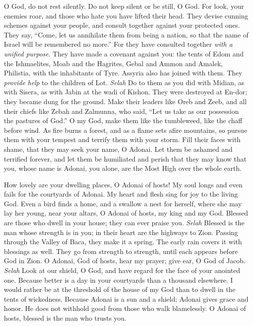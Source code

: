 \begin{biblechapter} %
 O God, do not rest silently. 
Do not keep silent or be still, O God.
\verse For look, your enemies roar, 
and those who hate you have lifted their head.
\verse They devise cunning schemes against your people, 
and consult together against your protected ones.
\verse They say, “Come, let us annihilate them from being a nation, 
so that the name of Israel will be remembered no more.”
\verse For they have consulted together \textit{with a unified purpose}. 
They have made a covenant against you:
\verse the tents of Edom and the Ishmaelites, 
Moab and the Hagrites,
\verse Gebal and Ammon and Amalek, 
Philistia, with the inhabitants of Tyre.
\verse Assyria also has joined with them. 
They \textit{provide help} to the children of Lot. \textit{Selah}
\verse Do to them as you did with Midian, 
as with Sisera, as with Jabin at the wadi of Kishon.
\verse They were destroyed at En-dor; 
they became dung for the ground.
\verse Make their leaders like Oreb and Zeeb, 
and all their chiefs like Zebah and Zalmunna,
\verse who said, “Let us take as our possession 
the pastures of God.”
\verse O my God, make them like the tumbleweed, 
like the chaff before wind.
\verse As fire burns a forest, 
and as a flame sets afire mountains,
\verse so pursue them with your tempest 
and terrify them with your storm.
\verse Fill their faces with shame, 
that they may seek your name, O Adonai.
\verse Let them be ashamed and terrified forever, 
and let them be humiliated and perish
\verse that they may know that you, 
whose name is Adonai, you alone, 
are the Most High over the whole earth.
\end{biblechapter}

\begin{biblechapter} %
 How lovely are your dwelling places, 
O Adonai of hosts!
\verse My soul longs and even fails 
for the courtyards of Adonai. 
My heart and flesh sing for joy 
to the living God.
\verse Even a bird finds a home, and a swallow a nest for herself, 
where she may lay her young, 
near your altars, O Adonai of hosts, 
my king and my God.
\verse Blessed are those who dwell in your house; 
they can ever praise you. \textit{Selah}
\verse Blessed is the man whose strength is in you; 
in their heart are the highways to Zion.
\verse Passing through the Valley of Baca, 
they make it a spring. 
The early rain covers it with blessings as well.
\verse They go from strength to strength, 
until each appears before God in Zion.
\verse O Adonai, God of hosts, hear my prayer; 
give ear, O God of Jacob. \textit{Selah}
\verse Look at our shield, O God, 
and have regard for the face of your anointed one.
\verse Because better is a day in your courtyards 
than a thousand elsewhere. 
I would rather be at the threshold of the house of my God 
than to dwell in the tents of wickedness.
\verse Because Adonai is a sun and a shield; 
Adonai gives grace and honor. 
He does not withhold good from those who walk blamelessly.
\verse O Adonai of hosts, 
blessed is the man who trusts you.
\end{biblechapter}

